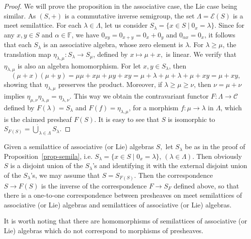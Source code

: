 \documentclass[10pt,a4paper]{amsart}
\theoremstyle{definition}
\theoremstyle{remark}
\numberwithin{equation}{section}
\newtheorem*{Theorem A}{\textbf{Theorem A}}
\newtheorem*{Corollary E}{\textbf{Corollary E}}
\newtheorem*{Corollary F}{\textbf{Corollary F}}
\newtheorem*{Theorem B}{\textbf{Theorem B}}
\newtheorem*{Theorem C}{\textbf{Theorem C}}
\newtheorem*{Theorem D}{\textbf{Theorem B}}
\newtheorem*{p a}{\textbf{Proof of  Theorem A}}
\newtheorem*{p b}{\textbf{Proof of Theorem B}}
\newtheorem*{p c}{\textbf{Proof of  Theorem C}}
\newtheorem*{p d}{\textbf{Proof of  Theorem D}}
\newcommand{\E}{\mathcal{E}}
\newcommand{\F}{\mathbb{F}}
\newcommand{\0}{{\vartheta}}
\begin{document}
\begin{proof}
We will prove the proposition in the associative case, the Lie case being similar. 
As $(S,+)$ is a commutative inverse semigroup, the set $\Lambda=\E(S)$ is a meet semilattice.  For each $\lambda\in \Lambda$, let us consider $S_{\lambda}=\{ x\in S\mid 0_x=\lambda\}$. Since for any $x,y\in S$ and $\alpha\in \F$, we have $0_{xy}=0_{x+y}=0_x+0_y$ and $0_{\alpha x}=0_x$, it follows that each $S_\lambda$ is an associative algebra, whose zero element is $\lambda$. For $\lambda\geq \mu$, the translation map $\eta_{\lambda,\mu}:S_{\lambda} \rightarrow S_{\mu}$, defined by $x\mapsto \mu+x,$ is  linear. We verify that $\eta_{\lambda,\mu}$ is also an algebra homomorphism. For let $x,y\in S_\lambda$, then
$$(\mu+x)(\mu+y)=\mu\mu+x\mu+\mu y+xy=
 \mu+\lambda+\mu+\lambda+\mu+xy=\mu+xy,$$  showing that $\eta_{\lambda,\mu}$ preserves the product. Moreover, if  $\lambda\geq \mu \geq \nu$,  then 
$\nu=\mu+\nu$ implies $ \eta_{\mu,\nu} \eta_{\lambda,\mu}= \eta_{\lambda,\nu}$.   This way we obtain  the contravariant functor $F:\Lambda\to \mathcal{C}$ defined by $F(\lambda)=S_\lambda$ and $F(f)=\eta_{\lambda,\mu}$, for a morphism $f:\mu \to \lambda$ in $\Lambda$, which is the claimed  presheaf $F(S).$ It is easy to see that $S$ is isomorphic to   $S_{F(S)}=\dot{\bigcup}_{\lambda\in \Lambda} S_{\lambda}.$ 
\end{proof}

Given  a semilattice of  associative (or Lie) algebras $S,$  let $S_{\lambda}$ be as in the proof of Proposition~\ref{prop-semila}, i.e.   $S_{\lambda}=\{ x\in S\mid 0_x=\lambda\}$, $(\lambda \in \Lambda).$ Then obviously $S$ is a disjoint union of the $S_{\lambda}$'s and identifying it with the external disjoint union of the $S_{\lambda}$'s, we may assume that  $S =S_{F(S)}.$ Then the correspondence $S\to F(S)$ is the inverse of the correspondence $F\to S_F$ defined above, so that there is a one-to-one correspondence between 
presheaves on meet semilattices of associative (or Lie) algebras and   semilattices of associative (or Lie) algebras.

 It is worth noting  that there are homomorphisms 
 of semilattices of associative (or Lie) algebras which do not  correspond to morphisms of presheaves.

\end{document}
